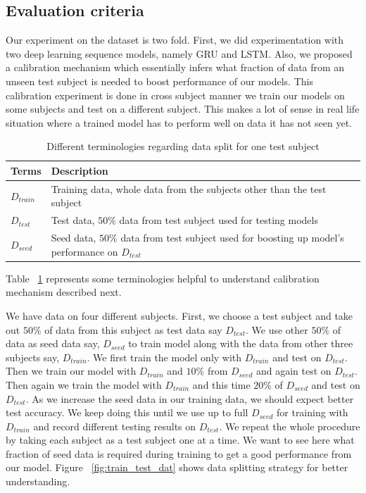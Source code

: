 \documentclass[10pt,twocolumn,letterpaper]{article}
\begin{document}
\subsection{Evaluation criteria}
Our experiment on the dataset is two fold. First, we did experimentation with two deep learning sequence models, namely GRU and LSTM. Also, we proposed a calibration mechanism which essentially infers what fraction of data from an unseen test subject is needed to boost performance of our models. This calibration experiment is done in cross subject manner \eg we train our models on some subjects and test on a different subject. This makes a lot of sense in real life situation where a trained model has to perform well on data it has not seen yet. 

\begin{table}[h]
	\begin{center}
		\begin{tabular}{|m{1cm}|m{5cm}|}
			\hline
			Terms & Description\\
			\hline\hline
			$D_{train}$ & Training data, whole data from the subjects other than the test subject \\
			\hline
			$D_{test}$ & Test data, $50\%$ data from test subject used for testing models\\
			\hline
			$D_{seed}$ & Seed data, $50\%$ data from test subject used for boosting up model's performance on $D_{test}$\\
			\hline
		\end{tabular}
	\end{center}
	\caption{Different terminologies regarding data split for one test subject}
	\label{table:terminology_eval}
\end{table}
Table ~\ref{table:terminology_eval} represents some terminologies helpful to understand calibration mechanism described next.

We have data on four different subjects. First, we choose a test subject and take out $50\%$ of data from this subject as test data say $D_{test}$. We use other $50\%$ of data as seed data say, $D_{seed}$ to train model along with the data from other three subjects say, $D_{train}$. We first train the model only with $D_{train}$ and test on $D_{test}$. Then we train our model with $D_{train}$ and $10\%$ from $D_{seed}$ and again test on $D_{test}$. Then again we train the model with $D_{train}$ and this time $20\%$ of $D_{seed}$ and test on $D_{test}$. As we increase the seed data in our training data, we should expect better test accuracy. We keep doing this until we use up to full $D_{seed}$ for training with $D_{train}$ and record different testing results on $D_{test}$. We repeat the whole procedure by taking each subject as a test subject one at a time. We want to see here what fraction of seed data is required during training to get a good performance from our model. Figure ~\ref{fig:train_test_dat} shows data splitting strategy for better understanding.
\end{document}
